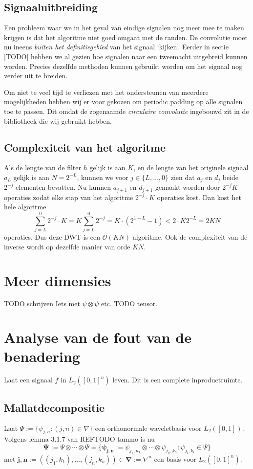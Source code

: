 \documentclass[11pt]{amsart}
\begin{document}
\subsection{Signaaluitbreiding}
Een probleem waar we in het geval van eindige signalen nog meer mee te maken krijgen is dat het algoritme niet goed omgaat met de randen. De convolutie moet nu ineens \emph{buiten het definitiegebied} van het signaal `kijken'. Eerder in sectie [TODO] hebben we al gezien hoe signalen naar een tweemacht uitgebreid kunnen worden. Precies dezelfde methoden kunnen gebruikt worden om het signaal nog verder uit te breiden. 

Om niet te veel tijd te verliezen met het ondersteunen van meerdere mogelijkheden hebben wij er voor gekozen om periodic padding op alle signalen toe te passen. Dit omdat de zogenaamde \emph{circulaire convolutie} ingebouwd zit in de bibliotheek die wij gebruikt hebben.

\subsection{Complexiteit van het algoritme}
Als de lengte van de filter $h$ gelijk is aan $K$, en de lengte van het originele signaal $a_L$ gelijk is aan $N = 2^{-L}$, kunnen we voor $j \in \{L, \ldots, 0\}$ zien dat $a_j$ en $d_j$ beide $2^{-j}$ elementen bevatten. Nu kunnen $a_{j+1}$ en $d_{j+1}$ gemaakt worden door $2^{-j}K$ operaties zodat elke stap van het algoritme $2^{-j} \cdot K$ operaties kost. Dan kost het hele algoritme
\[
	\sum_{j=L}^0 2^{-j} \cdot K = K \sum_{j=L}^0 2^{-j} = K \cdot (2^{1-L} - 1) < 2 \cdot K 2^{-L} = 2KN
\]
operaties. Dus deze DWT is een $\mathcal{O}(KN)$ algoritme. Ook de complexiteit van de inverse wordt op dezelfde manier van orde $KN$. 

\section{Meer dimensies}
TODO schrijven
Iets met $\psi \otimes \psi$ etc.
TODO tensor.

\section{Analyse van de fout van de benadering}
Laat een signaal $f$ in $L_2([0,1]^n)$ leven. Dit is een complete inproductruimte. 

\subsection{Mallatdecompositie}
Laat $\Psi := \{ \psi_{j,n}: (j,n) \in \nabla \}$ een orthonormale waveletbasis voor $L_2([0,1])$. Volgens lemma 3.1.7 van REFTODO tammo is nu
\[
  \boldsymbol{\Psi} := \Psi \otimes \cdots \otimes \Psi = \{ \boldsymbol{\psi_{j,n}} := \psi_{j_1,n_1} \otimes \cdots \otimes \psi_{j_n,k_n}: \psi_{j_i,k_i} \in \Psi \}
\]
met $\boldsymbol{j,n} := ((j_1,k_1),\ldots,(j_n,k_n)) \in \boldsymbol{\nabla} := \nabla^n$ een basis voor $L_2([0,1]^n)$.
\end{document}
